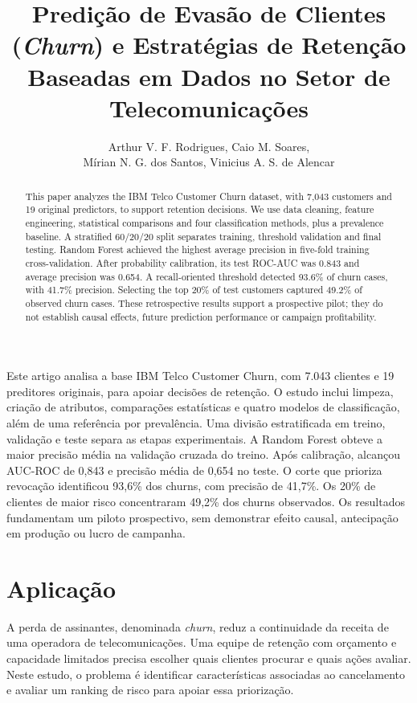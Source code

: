 \documentclass[12pt]{article}
\title{Predição de Evasão de Clientes (\textit{Churn}) e Estratégias de Retenção Baseadas em Dados no Setor de Telecomunicações}
\author{Arthur V. F. Rodrigues\inst{1}, Caio M. Soares\inst{1},\\
Mírian N. G. dos Santos\inst{1}, Vinicius A. S. de Alencar\inst{1}}
\begin{document}
\maketitle

\begin{abstract}
This paper analyzes the IBM Telco Customer Churn dataset, with 7,043 customers and 19 original predictors, to support retention decisions. We use data cleaning, feature engineering, statistical comparisons and four classification methods, plus a prevalence baseline. A stratified 60/20/20 split separates training, threshold validation and final testing. Random Forest achieved the highest average precision in five-fold training cross-validation. After probability calibration, its test ROC-AUC was 0.843 and average precision was 0.654. A recall-oriented threshold detected 93.6\% of churn cases, with 41.7\% precision. Selecting the top 20\% of test customers captured 49.2\% of observed churn cases. These retrospective results support a prospective pilot; they do not establish causal effects, future prediction performance or campaign profitability.
\end{abstract}

\begin{resumo}
Este artigo analisa a base IBM Telco Customer Churn, com 7.043 clientes e 19 preditores originais, para apoiar decisões de retenção. O estudo inclui limpeza, criação de atributos, comparações estatísticas e quatro modelos de classificação, além de uma referência por prevalência. Uma divisão estratificada em treino, validação e teste separa as etapas experimentais. A Random Forest obteve a maior precisão média na validação cruzada do treino. Após calibração, alcançou AUC-ROC de 0,843 e precisão média de 0,654 no teste. O corte que prioriza revocação identificou 93,6\% dos churns, com precisão de 41,7\%. Os 20\% de clientes de maior risco concentraram 49,2\% dos churns observados. Os resultados fundamentam um piloto prospectivo, sem demonstrar efeito causal, antecipação em produção ou lucro de campanha.
\end{resumo}

\section{Aplicação}\label{sec:aplicacao}
A perda de assinantes, denominada \textit{churn}, reduz a continuidade da receita de uma operadora de telecomunicações. Uma equipe de retenção com orçamento e capacidade limitados precisa escolher quais clientes procurar e quais ações avaliar. Neste estudo, o problema é identificar características associadas ao cancelamento e avaliar um ranking de risco para apoiar essa priorização.
\end{document}
